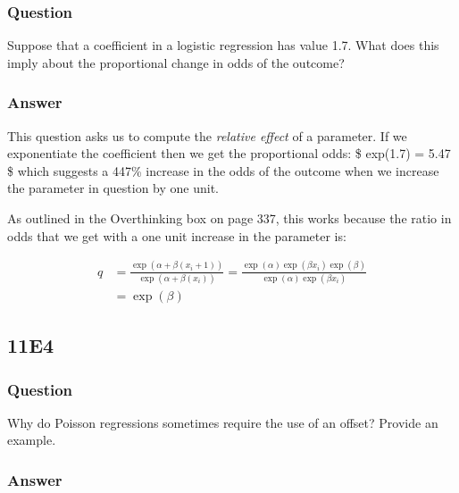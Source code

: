 \documentclass[
]{book}
\begin{document}
\hypertarget{question-83}{%
\subsubsection*{Question}\label{question-83}}

Suppose that a coefficient in a logistic regression has value 1.7. What does this imply about the proportional change in odds of the outcome?

\hypertarget{answer-83}{%
\subsubsection*{Answer}\label{answer-83}}

This question asks us to compute the \emph{relative effect} of a parameter. If we exponentiate the coefficient then we get the proportional odds: \$ exp(1.7) = 5.47 \$ which suggests a 447\% increase in the odds of the outcome when we increase the parameter in question by one unit.

As outlined in the Overthinking box on page 337, this works because the ratio in odds that we get with a one unit increase in the parameter is:

\[
\begin{aligned}
q &= \frac{\exp(\alpha + \beta(x_i + 1) )}{\exp(\alpha + \beta(x_i))} = \frac{\exp(\alpha) \exp(\beta x_i) \exp(\beta)}{\exp(\alpha) \exp(\beta x_i)} \\
 &= \exp(\beta)
\end{aligned}
\]

\hypertarget{e4-6}{%
\subsection*{11E4}\label{e4-6}}

\hypertarget{question-84}{%
\subsubsection*{Question}\label{question-84}}

Why do Poisson regressions sometimes require the use of an offset? Provide an example.

\hypertarget{answer-84}{%
\subsubsection*{Answer}\label{answer-84}}
\end{document}
